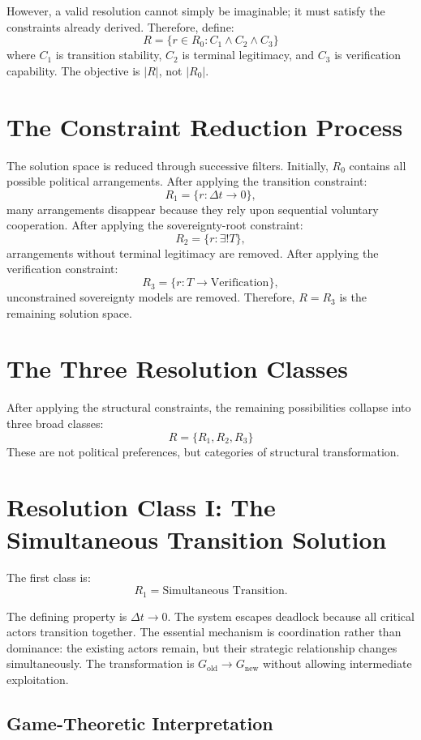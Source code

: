 \documentclass[11pt,openany]{book}
\theoremstyle{plain}
\theoremstyle{definition}
\begin{document}
However, a valid resolution cannot simply be imaginable; it must satisfy the constraints already derived. Therefore, define:
\[
R = \{r \in R_0 : C_1 \land C_2 \land C_3\}
\]
where \(C_1\) is transition stability, \(C_2\) is terminal legitimacy, and \(C_3\) is verification capability. The objective is \(|R|\), not \(|R_0|\).

\section*{The Constraint Reduction Process}

The solution space is reduced through successive filters. Initially, \(R_0\) contains all possible political arrangements. After applying the transition constraint:
\[
R_1 = \{r : \Delta t \to 0\},
\]
many arrangements disappear because they rely upon sequential voluntary cooperation. After applying the sovereignty-root constraint:
\[
R_2 = \{r : \exists ! T\},
\]
arrangements without terminal legitimacy are removed. After applying the verification constraint:
\[
R_3 = \{r : T \to \text{Verification}\},
\]
unconstrained sovereignty models are removed. Therefore, \(R = R_3\) is the remaining solution space.

\section*{The Three Resolution Classes}

After applying the structural constraints, the remaining possibilities collapse into three broad classes:
\[
\boxed{
R = \{R_1, R_2, R_3\}
}
\]
These are not political preferences, but categories of structural transformation.

\section*{Resolution Class I: The Simultaneous Transition Solution}

The first class is:
\[
R_1 = \text{Simultaneous Transition}.
\]

The defining property is \(\Delta t \to 0\). The system escapes deadlock because all critical actors transition together. The essential mechanism is coordination rather than dominance: the existing actors remain, but their strategic relationship changes simultaneously. The transformation is \(G_{\text{old}} \to G_{\text{new}}\) without allowing intermediate exploitation.

\subsection*{Game-Theoretic Interpretation}
\end{document}

